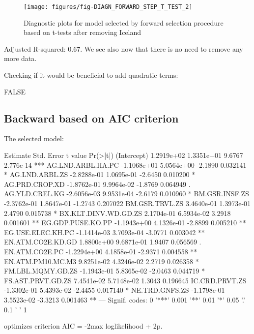 \documentclass[a4paper]{article}
\begin{document}
\begin{figure}[H]
\begin{center}
\texttt{[image: figures/fig-DIAGN\_FORWARD\_STEP\_T\_TEST\_2]}
\caption{Diagnostic plots for model selected by forward selection procedure based
on t-tests after removing Iceland}
\end{center}
\end{figure}
Adjusted R-squared:
0.67. We see also now
that there is no need to remove any more data.

Checking if it would be beneficial to add quadratic terms:
\begin{Schunk}
\begin{Soutput}
[1] FALSE
\end{Soutput}
\end{Schunk}

\subsection{Backward based on AIC criterion}
The selected model:
\begin{Schunk}
\begin{Soutput}
                        Estimate  Std. Error t value  Pr(>|t|)    
(Intercept)           1.2919e+02  1.3351e+01  9.6767 2.776e-14 ***
AG.LND.ARBL.HA.PC    -1.1068e+01  5.0564e+00 -2.1890  0.032141 *  
AG.LND.ARBL.ZS       -2.8288e-01  1.0695e-01 -2.6450  0.010200 *  
AG.PRD.CROP.XD       -1.8762e-01  9.9964e-02 -1.8769  0.064949 .  
AG.YLD.CREL.KG       -2.6056e-03  9.9531e-04 -2.6179  0.010960 *  
BM.GSR.INSF.ZS       -2.3762e-01  1.8647e-01 -1.2743  0.207022    
BM.GSR.TRVL.ZS        3.4640e-01  1.3973e-01  2.4790  0.015738 *  
BX.KLT.DINV.WD.GD.ZS  2.1704e-01  6.5934e-02  3.2918  0.001601 ** 
EG.GDP.PUSE.KO.PP    -1.1943e+00  4.1326e-01 -2.8899  0.005210 ** 
EG.USE.ELEC.KH.PC    -1.1414e-03  3.7093e-04 -3.0771  0.003042 ** 
EN.ATM.CO2E.KD.GD     1.8800e+00  9.6871e-01  1.9407  0.056569 .  
EN.ATM.CO2E.PC       -1.2294e+00  4.1858e-01 -2.9371  0.004558 ** 
EN.ATM.PM10.MC.M3     9.8251e-02  4.3246e-02  2.2719  0.026358 *  
FM.LBL.MQMY.GD.ZS    -1.1943e-01  5.8365e-02 -2.0463  0.044719 *  
FS.AST.PRVT.GD.ZS     7.4541e-02  5.7148e-02  1.3043  0.196645    
IC.CRD.PRVT.ZS       -1.3302e-01  5.4393e-02 -2.4455  0.017140 *  
NE.TRD.GNFS.ZS       -1.1798e-01  3.5523e-02 -3.3213  0.001463 ** 
---
Signif. codes:  0 '***' 0.001 '**' 0.01 '*' 0.05 '.' 0.1 ' ' 1
\end{Soutput}
\end{Schunk}
optimizes criterion AIC = -2max loglikelihood + 2p.
\end{document}
